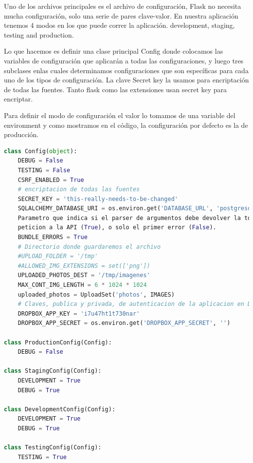\documentclass[a4paper,12pt]{article}
\begin{document}
\begin{itemize}

Uno de los archivos principales es el archivo de configuración, Flask no necesita mucha configuración, solo una serie de pares clave-valor. En nuestra aplicación tenemos 4 modos en los que puede correr la aplicación. development, staging, testing and production.

Lo que hacemos es definir una clase principal Config donde colocamos las variables de configuración que aplicarán a todas las configuraciones, y luego tres subclases enlas cuales determinamos configuraciones que son específicas para cada uno de los tipos de configuración. La clave Secret key la usamos para encriptación de todas las fuentes. Tanto flask como las extensiones usan secret key para encriptar.

Para definir el modo de configuración el valor lo tomamos de una variable del environment y como mostramos en el código, la configuración por defecto es la de producción.
    
\begin{lstlisting}[language=Python]
class Config(object):
    DEBUG = False
    TESTING = False
    CSRF_ENABLED = True
    # encriptacion de todas las fuentes
    SECRET_KEY = 'this-really-needs-to-be-changed'
    SQLALCHEMY_DATABASE_URI = os.environ.get('DATABASE_URL', 'postgresql:///salud_dev?client_encoding=utf8')
    Parametro que indica si el parser de argumentos debe devolver la totalidad de los errores encontrados en una
    peticion a la API (True), o solo el primer error (False).
    BUNDLE_ERRORS = True
    # Directorio donde guardaremos el archivo
    #UPLOAD_FOLDER = '/tmp'
    #ALLOWED_IMG_EXTENSIONS = set(['png'])
    UPLOADED_PHOTOS_DEST = '/tmp/imagenes'
    MAX_CONT_IMG_LENGTH = 6 * 1024 * 1024
    uploaded_photos = UploadSet('photos', IMAGES)
    # Claves, publica y privada, de autenticacion de la aplicacion en Dropbox.
    DROPBOX_APP_KEY = 'i7u47ht1t730nar'
    DROPBOX_APP_SECRET = os.environ.get('DROPBOX_APP_SECRET', '')

class ProductionConfig(Config):
    DEBUG = False

class StagingConfig(Config):
    DEVELOPMENT = True
    DEBUG = True
    
class DevelopmentConfig(Config):
    DEVELOPMENT = True
    DEBUG = True
    
class TestingConfig(Config):
    TESTING = True
\end{lstlisting}


\end{itemize}
\end{document}
